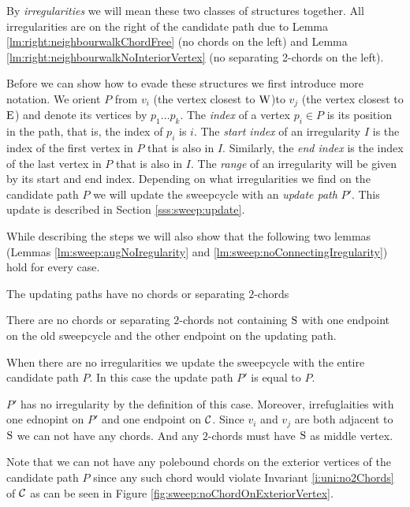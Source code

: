   By \emph{irregularities} we will mean these two classes of structures together.
  All irregularities are on the right of the candidate path due to Lemma \ref{lm:right:neighbourwalkChordFree} (no chords on the left) and Lemma \ref{lm:right:neighbourwalkNoInteriorVertex} (no separating 2-chords on the left).

  Before we can show how to evade these structures we first introduce more notation. We orient $P$ from $v_i$ (the vertex closest to $\mathrm{W}$)to $v_j$ (the vertex closest to $\mathrm{E}$) and denote its vertices by $p_1 \ldots p_k$.
  The \emph{index} of a vertex $p_i \in P$ is its position in the path, that is, the index of $p_i$ is $i$.
  The \emph{start index} of an irregularity $I$ is the index of the first vertex in $P$ that is also in $I$. Similarly, the \emph{end index} is the index of the last vertex in $P$ that is also in $I$.
  The \emph{range} of an irregularity will be given by its start and end index. Depending on what irregularities we find on the candidate path $P$ we will update the sweepcycle with an \emph{update path} $P'$. This update is described in Section \ref{sss:sweep:update}.

  While describing the steps we will also show that the following two lemmas (Lemmas \ref{lm:sweep:augNoIregularity} and \ref{lm:sweep:noConnectingIregularity}) hold for every case.

  \begin{lemma}
    The updating paths have no chords or separating $2$-chords
    \label{lm:sweep:augNoIregularity}
  \end{lemma}

  \begin{lemma}
    \label{lm:sweep:noConnectingIregularity}
    There are no chords or separating $2$-chords not containing $\mathrm{S}$ with one endpoint on the old sweepcycle and the other endpoint on the updating path.
  \end{lemma}

    When there are no irregularities we update the sweepcycle with the entire candidate path $P$.
    In this case the update path $P'$ is equal to $P$.

    $P'$ has no irregularity by the definition of this case. Moreover, irrefuglaities with one ednopint on $P'$ and one endpoint on $\mathcal{C}$. Since $v_i$ and $v_j$ are both adjacent to $\mathrm{S}$ we can not have any chords. And any $2$-chords must have $\mathrm{S}$ as middle vertex.

    Note that we can not have any polebound chords on the exterior vertices of the candidate path $P$ since any such chord would violate Invariant \ref{i:uni:no2Chords} of $\mathcal{C}$ as can be seen in Figure \ref{fig:sweep:noChordOnExteriorVertex}.

